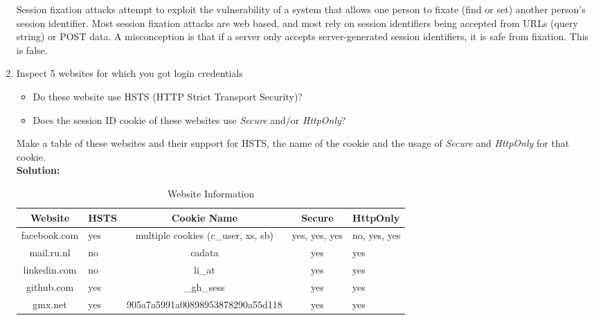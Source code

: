 \documentclass[a4paper]{article}
\begin{document}
\begin{enumerate}
Session fixation attacks attempt to exploit the vulnerability of a system that allows one person to fixate (find or set) another person's session identifier. Most session fixation attacks are web based, and most rely on session identifiers being accepted from URLs (query string) or POST data. A misconception is that if a server only accepts server-generated session identifiers, it is safe from fixation. This is false.\\


\item Inspect 5 websites for which you got login credentials
	\begin{itemize}
		\item Do these website use HSTS (HTTP Strict Transport Security)?
		\item Does the session ID cookie of these websites use \textit{Secure} and/or \textit{HttpOnly}?
	\end{itemize}

Make a table of these websites and their support for HSTS, the name of the cookie and the usage of \textit{Secure} and \textit{HttpOnly} for that cookie.\\
\textbf{Solution:}\\

\begin{table}[h!]
\centering
\label{my-label}
\begin{tabular}{|c|l|c|c|l|}
\hline
\textbf{Website} & \textbf{HSTS} & \textbf{Cookie Name}  & \textbf{Secure} & \textbf{HttpOnly} \\ \hline
facebook.com  & yes &   multiple cookies (c\_user, xs, sb)  & yes, yes, yes                      & no, yes, yes \\ \hline
mail.ru.nl   & no &  cadata                     &   yes                    & yes  \\ \hline
linkedin.com  & no & li\_at                      &    yes                   & yes  \\ \hline
github.com  & yes &   	\_gh\_sess                    &  yes                     & yes  \\ \hline
gmx.net & yes & 905a7a5991a00898953878290a55d118 & yes & yes \\ \hline
\end{tabular}
\caption{Website Information}
\end{table}


\end{enumerate}
\end{document}
